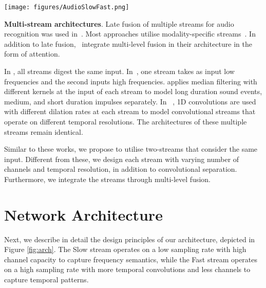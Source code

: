 \documentclass{article}
\begin{document}
\begin{figure*}[t]
    \centering
    \texttt{[image: figures/AudioSlowFast.png]}
    \vspace*{-12pt}
    \caption{Proposed Slow-Fast architecture. Strided input (by $\alpha$) to the Slow pathway, along with increased channels. The Fast pathway has less channels (by $\beta$). Right: two types of residual blocks with separable convolutions (brown vs green).}
\label{fig:arch}
\end{figure*}

\noindent\textbf{Multi-stream architectures}. Late fusion of multiple streams for audio recognition was used in~\cite{SuZWM19,Li2019,Bhatt2018,Wang2020_t1,mcdonnell_2020,Wu2020,Han2019}. Most approaches utilise modality-specific streams~\cite{SuZWM19,Li2019,Bhatt2018,Wang2020_t1}. 
In addition to late fusion,~\cite{Li2019,Bhatt2018} integrate multi-level fusion in their architecture in the form of attention. 

In \cite{mcdonnell_2020,Wu2020,Han2019}, all streams digest the same input.
In~\cite{mcdonnell_2020}, one stream takes as input low frequencies and the second inputs high frequencies. 
\cite{Wu2020} applies median filtering with different kernels at the input of each stream to model long duration sound events, medium, and short duration impulses separately. In~\cite{Han2019} , 1D convolutions are used with different dilation rates at each stream to model convolutional streams that operate on different temporal resolutions.
The architectures of these multiple streams remain identical.

Similar to these works, we propose to utilise two-streams that consider the same input. Different from these, we design each stream with varying number of channels and temporal resolution, in addition to convolutional separation. Furthermore, we integrate the streams through multi-level fusion.

\section{Network Architecture}
\label{sec:audioslowfast}

Next, we describe in detail the design principles of our architecture, depicted in Figure \ref{fig:arch}.
The Slow stream operates on a low sampling rate with high channel capacity to capture frequency semantics, while the Fast stream operates on a high sampling rate with more temporal convolutions and less channels to capture temporal patterns. 
\end{document}
